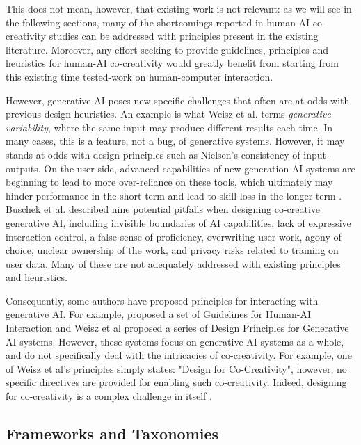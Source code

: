 This does not mean, however, that existing work is not relevant: as we will see in the following sections, many of the shortcomings reported in human-AI co-creativity studies can be addressed with principles present in the existing literature. Moreover, any effort seeking to provide guidelines, principles and heuristics for human-AI co-creativity would greatly benefit from starting from this existing time tested-work on human-computer interaction. 

However, generative AI poses new specific challenges that often are at odds with previous design heuristics. An example is what Weisz et al. \cite{Weisz2024-io} terms \textit{generative variability}, where the same input may produce different results each time. In many cases, this is a feature, not a bug, of generative systems. However, it may stands at odds with design principles such as Nielsen's consistency \cite{Nielsen1994-df} of input-outputs. On the user side, advanced capabilities of new generation AI systems are beginning to lead to more over-reliance on these tools, which ultimately may hinder performance in the short term and lead to skill loss in the longer term \cite{Buschek2021-ks, Dell-Acqua2022-dy, Gerlich2025-as}. Buschek et al. \cite{Buschek2021-ks} described nine potential pitfalls when designing co-creative generative AI, including invisible boundaries of AI capabilities, lack of expressive interaction control, a false sense of proficiency, overwriting user work, agony of choice, unclear ownership of the work, and privacy risks related to training on user data. Many of these are not adequately addressed with existing principles and heuristics.

Consequently, some authors have proposed principles for interacting with generative AI. For example, \cite{Amershi2019-wu} proposed a set of Guidelines for Human-AI Interaction and Weisz et al \cite{Weisz2024-io} proposed a series of Design Principles for Generative AI systems. However, these systems focus on generative AI systems as a whole, and do not specifically deal with the intricacies of co-creativity. For example, one of Weisz et al's principles simply states: "Design for Co-Creativity", however, no specific directives are provided for enabling such co-creativity. Indeed, designing for co-creativity is a complex challenge in itself \cite{Buschek2021-ks}. 

\subsection{Frameworks and Taxonomies}

